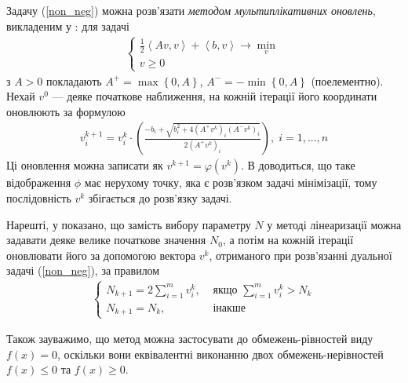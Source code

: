 \documentclass{extreport}
\begin{document}
Задачу (\ref{non_neg}) можна розв'язати \emph{методом мультиплікативних оновлень}, викладеним у \cite{3}:
для задачі
\begin{gather*}
    \begin{cases}
        \frac{1}{2}\left<A v, v\right> + \left<b, v \right> \to \underset{v}{\min} \\
        v \geq 0
    \end{cases}
\end{gather*}
з $A > 0$ покладають $A^{+} = \max\left\{0, A\right\}$, $A^{-} = -\min\left\{0, A\right\}$ (поелементно).
Нехай $v^{0}$ --- деяке початкове наближення, на кожній ітерації його координати оновлюють за формулою
\begin{gather*}
    v^{k+1}_i = v^{k}_i \cdot \left(\frac{
        - b_i + \sqrt{b_i^2 + 4 \left(A^+ v^{k}\right)_i \left(A^- v^{k}\right)_i}
    }{
        2 \left(A^+ v^{k}\right)_i
    }\right), \; i = 1, ..., n
\end{gather*}
Ці оновлення можна записати як $v^{k+1} = \varphi\left(v^{k}\right)$. В \cite{3} доводиться, що таке
відображення $\phi$ має нерухому точку, яка є розв'язком задачі мінімізації, тому
послідовність $v^{k}$ збігається до розв'язку задачі.

Нарешті, у \cite{1} показано, що замість вибору параметру $N$ у методі лінеаризації
можна задавати деяке велике початкове значення $N_0$, а потім на кожній ітерації оновлювати його
за допомогою вектора $v^k$, отриманого при розв'язанні дуальної задачі (\ref{non_neg}), за правилом
\begin{gather*}
    \begin{cases}
        N_{k+1} = 2\sum\limits_{i=1}^m v^k_i, & \text{ якщо } \sum\limits_{i=1}^m v^k_i > N_k \\
        N_{k+1} = N_k, & \text{ інакше}
    \end{cases}
\end{gather*}

Також зауважимо, що метод можна застосувати до обмежень-рівностей виду $f(x) = 0$,
оскільки вони еквівалентні виконанню двох обмежень-нерівностей $f(x) \leq 0$ та $f(x) \geq 0$.
\end{document}
